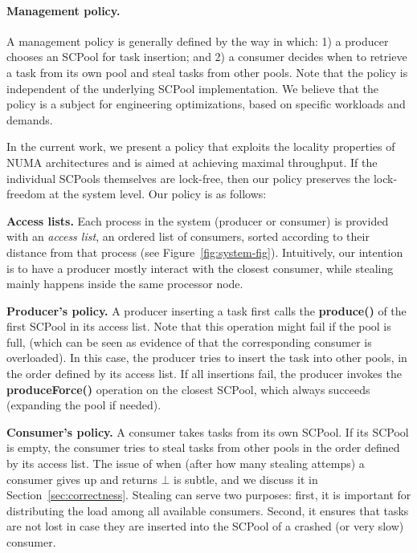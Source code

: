 \negspace
\paragraph {Management policy.}
A management policy is generally defined by the way in which: 1) a producer chooses an SCPool for task insertion; and 2) a consumer decides when to retrieve a task from its own pool and steal tasks from other pools. 
Note that the policy is independent of the underlying SCPool implementation. We believe that the policy is a subject for engineering optimizations, based on specific workloads and demands.

In the current work, we present a policy that exploits the locality properties of NUMA architectures and is aimed at achieving maximal throughput. If the individual SCPools themselves are lock-free, then our policy preserves the lock-freedom at the system level. Our policy is as follows:
\snegspace
\begin{item*}
	\item {\bf Access lists.} Each process in the system (producer or consumer) is provided with an \emph{access list}, an ordered list of consumers, sorted according to their distance from that process (see Figure~\ref{fig:system-fig}). Intuitively, our intention is to have a producer mostly interact with the closest consumer, while stealing mainly happens inside the same processor node. 
	\item {\bf Producer's policy.} A producer inserting a task first calls the {\bf produce()} of the first SCPool in its access list. Note that this operation might fail if the pool is full, (which can be seen as evidence of that the corresponding consumer is overloaded).  In this case, the producer tries to insert the task into other pools, in the order defined by its access list. If all insertions fail, the producer invokes the {\bf produceForce()} operation on the closest SCPool, which always succeeds (expanding the pool if needed). 
	\item {\bf Consumer's policy.} A consumer takes tasks from its own SCPool. If its SCPool is empty, the consumer tries to steal tasks from other pools in the order defined by its access list. The issue of when (after how many stealing attemps) a consumer gives up and returns $\bot$ is subtle, and we discuss it in Section~\ref{sec:correctness}. Stealing can serve two purposes: first, it is important for distributing the load among all available consumers. Second, it ensures that tasks are not lost in case they are inserted into  the SCPool of a crashed (or  very slow) consumer.
\end{item*}
